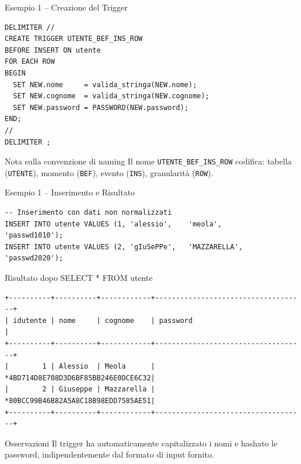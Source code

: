 \documentclass[aspectratio=169]{beamer}
\begin{document}
\begin{frame}[fragile]{Esempio 1 -- Creazione del Trigger}
  \begin{lstlisting}[style=sqlstyle]
DELIMITER //
CREATE TRIGGER UTENTE_BEF_INS_ROW
BEFORE INSERT ON utente
FOR EACH ROW
BEGIN
  SET NEW.nome     = valida_stringa(NEW.nome);
  SET NEW.cognome  = valida_stringa(NEW.cognome);
  SET NEW.password = PASSWORD(NEW.password);
END;
//
DELIMITER ;
  \end{lstlisting}
  \begin{alertblock}{Nota sulla convenzione di naming}
    Il nome \texttt{UTENTE\_BEF\_INS\_ROW} codifica:
    tabella (\texttt{UTENTE}), momento (\texttt{BEF}),
    evento (\texttt{INS}), granularità (\texttt{ROW}).
  \end{alertblock}
\end{frame}

\begin{frame}[fragile]{Esempio 1 -- Inserimento e Risultato}
  \begin{lstlisting}[style=sqlstyle]
-- Inserimento con dati non normalizzati
INSERT INTO utente VALUES (1, 'alessio',    'meola',       'passwd1010');
INSERT INTO utente VALUES (2, 'gIuSePPe',   'MAZZARELLA',  'passwd2020');
  \end{lstlisting}
  \vspace{0.2cm}
  \begin{exampleblock}{Risultato dopo SELECT * FROM utente}
    \begin{lstlisting}[style=outputstyle]
+----------+----------+------------+------------------------------------+
| idutente | nome     | cognome    | password                           |
+----------+----------+------------+------------------------------------+
|        1 | Alessio  | Meola      | *4BD714D8E708D3D6BF85BB246E0DCE6C32|
|        2 | Giuseppe | Mazzarella | *80BCC99B46B82A5A8C18B98EDD7585AE51|
+----------+----------+------------+------------------------------------+
    \end{lstlisting}
  \end{exampleblock}
  \begin{block}{Osservazioni}
    Il trigger ha automaticamente capitalizzato i nomi e hashato le password,
    indipendentemente dal formato di input fornito.
  \end{block}
\end{frame}
\end{document}
